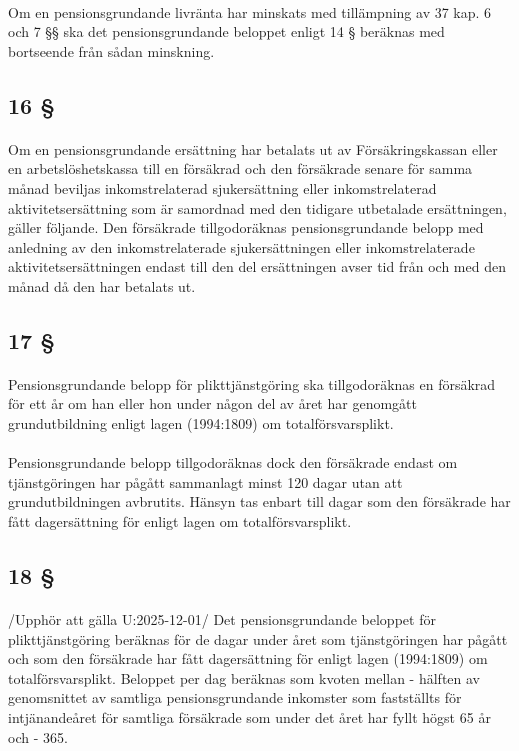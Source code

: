 \documentclass[a4paper,notitlepage,openany,10pt]{book}
\begin{document}
\paragraph*{}
Om en pensionsgrundande livränta har minskats med tillämpning av 37 kap. 6 och 7 §§ ska det pensionsgrundande beloppet enligt 14 § beräknas med bortseende från sådan minskning.
\subsection*{16 §}
\paragraph*{}
Om en pensionsgrundande ersättning har betalats ut av Försäkringskassan eller en arbetslöshetskassa till en försäkrad och den försäkrade senare för samma månad beviljas inkomstrelaterad sjukersättning eller inkomstrelaterad aktivitetsersättning som är samordnad med den tidigare utbetalade ersättningen, gäller följande. Den försäkrade tillgodoräknas pensionsgrundande belopp med anledning av den inkomstrelaterade sjukersättningen eller inkomstrelaterade aktivitetsersättningen endast till den del ersättningen avser tid från och med den månad då den har betalats ut.
\subsection*{17 §}
\paragraph*{}
Pensionsgrundande belopp för plikttjänstgöring ska tillgodoräknas en försäkrad för ett år om han eller hon under någon del av året har genomgått grundutbildning enligt lagen (1994:1809) om totalförsvarsplikt.
\paragraph*{}
Pensionsgrundande belopp tillgodoräknas dock den försäkrade endast om tjänstgöringen har pågått sammanlagt minst 120 dagar utan att grundutbildningen avbrutits. Hänsyn tas enbart till dagar som den försäkrade har fått dagersättning för enligt lagen om totalförsvarsplikt.
\subsection*{18 §}
\paragraph*{}
/Upphör att gälla U:2025-12-01/
Det pensionsgrundande beloppet för plikttjänstgöring beräknas för de dagar under året som tjänstgöringen har pågått och som den försäkrade har fått dagersättning för enligt lagen (1994:1809) om totalförsvarsplikt. Beloppet per dag beräknas som kvoten mellan
\newline - hälften av genomsnittet av samtliga pensionsgrundande inkomster som fastställts för intjänandeåret för samtliga försäkrade som under det året har fyllt högst 65 år och
\newline - 365.
\end{document}
